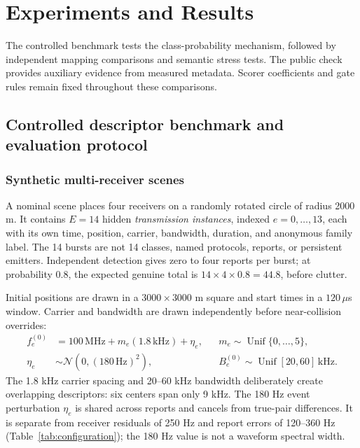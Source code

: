 \section{Experiments and Results}\label{sec:experiments}
The controlled benchmark tests the class-probability mechanism, followed by independent mapping comparisons and semantic stress tests. The public check provides auxiliary evidence from measured metadata. Scorer coefficients and gate rules remain fixed throughout these comparisons.

\subsection{Controlled descriptor benchmark and evaluation protocol}
\subsubsection{Synthetic multi-receiver scenes}
A nominal scene places four receivers on a randomly rotated circle of radius 2000 m. It contains $E=14$ hidden \emph{transmission instances}, indexed $e=0,\ldots,13$, each with its own time, position, carrier, bandwidth, duration, and anonymous family label. The 14 bursts are not 14 classes, named protocols, reports, or persistent emitters. Independent detection gives zero to four reports per burst; at probability 0.8, the expected genuine total is $14\times4\times0.8=44.8$, before clutter.

Initial positions are drawn in a $3000\times3000$ m square and start times in a $120\,\mu$s window. Carrier and bandwidth are drawn independently before near-collision overrides:
\begin{equation}
 \begin{aligned}
 f_e^{(0)}&=100\,\mathrm{MHz}+m_e(1.8\,\mathrm{kHz})+\eta_e,
 &&m_e\sim\operatorname{Unif}\{0,\ldots,5\},\\
 \eta_e&\sim\mathcal N(0,(180\,\mathrm{Hz})^2),
 &&B_e^{(0)}\sim\operatorname{Unif}[20,60]\,\mathrm{kHz}.
 \end{aligned}
 \label{eq:carrier_generator}
\end{equation}
The 1.8 kHz carrier spacing and 20--60 kHz bandwidth deliberately create overlapping descriptors: six centers span only 9 kHz. The 180 Hz event perturbation $\eta_e$ is shared across reports and cancels from true-pair differences. It is separate from receiver residuals of 250 Hz and report errors of 120--360 Hz (Table~\ref{tab:configuration}); the 180 Hz value is not a waveform spectral width.


